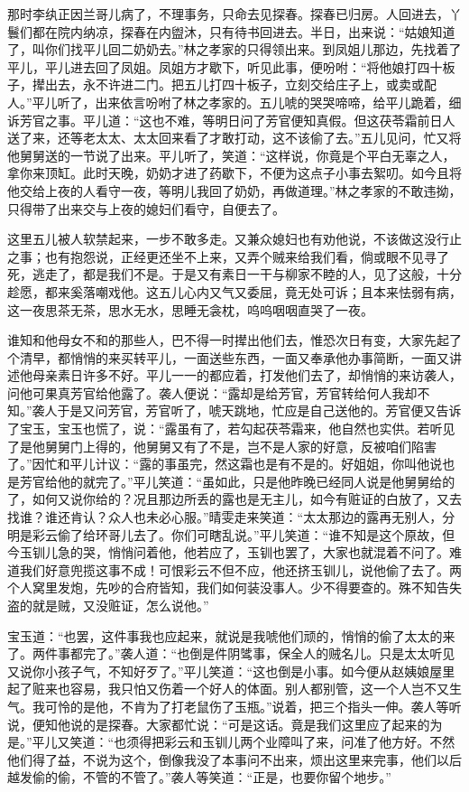 那时李纨正因兰哥儿病了，不理事务，只命去见探春。探春已归房。人回进去，丫鬟们都在院内纳凉，探春在内盥沐，只有待书回进去。半日，出来说：``姑娘知道了，叫你们找平儿回二奶奶去。''林之孝家的只得领出来。到凤姐儿那边，先找着了平儿，平儿进去回了凤姐。凤姐方才歇下，听见此事，便吩咐：``将他娘打四十板子，撵出去，永不许进二门。把五儿打四十板子，立刻交给庄子上，或卖或配人。''平儿听了，出来依言吩咐了林之孝家的。五儿唬的哭哭啼啼，给平儿跪着，细诉芳官之事。平儿道：``这也不难，等明日问了芳官便知真假。但这茯苓霜前日人送了来，还等老太太、太太回来看了才敢打动，这不该偷了去。''五儿见问，忙又将他舅舅送的一节说了出来。平儿听了，笑道：``这样说，你竟是个平白无辜之人，拿你来顶缸。此时天晚，奶奶才进了药歇下，不便为这点子小事去絮叨。如今且将他交给上夜的人看守一夜，等明儿我回了奶奶，再做道理。''林之孝家的不敢违拗，只得带了出来交与上夜的媳妇们看守，自便去了。

这里五儿被人软禁起来，一步不敢多走。又兼众媳妇也有劝他说，不该做这没行止之事；也有抱怨说，正经更还坐不上来，又弄个贼来给我们看，倘或眼不见寻了死，逃走了，都是我们不是。于是又有素日一干与柳家不睦的人，见了这般，十分趁愿，都来奚落嘲戏他。这五儿心内又气又委屈，竟无处可诉；且本来怯弱有病，这一夜思茶无茶，思水无水，思睡无衾枕，呜呜咽咽直哭了一夜。

谁知和他母女不和的那些人，巴不得一时撵出他们去，惟恐次日有变，大家先起了个清早，都悄悄的来买转平儿，一面送些东西，一面又奉承他办事简断，一面又讲述他母亲素日许多不好。平儿一一的都应着，打发他们去了，却悄悄的来访袭人，问他可果真芳官给他露了。袭人便说：``露却是给芳官，芳官转给何人我却不知。''袭人于是又问芳官，芳官听了，唬天跳地，忙应是自己送他的。芳官便又告诉了宝玉，宝玉也慌了，说：``露虽有了，若勾起茯苓霜来，他自然也实供。若听见了是他舅舅门上得的，他舅舅又有了不是，岂不是人家的好意，反被咱们陷害了。''因忙和平儿计议：``露的事虽完，然这霜也是有不是的。好姐姐，你叫他说也是芳官给他的就完了。''平儿笑道：``虽如此，只是他昨晚已经同人说是他舅舅给的了，如何又说你给的？况且那边所丢的露也是无主儿，如今有赃证的白放了，又去找谁？谁还肯认？众人也未必心服。''晴雯走来笑道：``太太那边的露再无别人，分明是彩云偷了给环哥儿去了。你们可瞎乱说。''平儿笑道：``谁不知是这个原故，但今玉钏儿急的哭，悄悄问着他，他若应了，玉钏也罢了，大家也就混着不问了。难道我们好意兜揽这事不成！可恨彩云不但不应，他还挤玉钏儿，说他偷了去了。两个人窝里发炮，先吵的合府皆知，我们如何装没事人。少不得要查的。殊不知告失盗的就是贼，又没赃证，怎么说他。''

宝玉道：``也罢，这件事我也应起来，就说是我唬他们顽的，悄悄的偷了太太的来了。两件事都完了。''袭人道：``也倒是件阴骘事，保全人的贼名儿。只是太太听见又说你小孩子气，不知好歹了。''平儿笑道：``这也倒是小事。如今便从赵姨娘屋里起了赃来也容易，我只怕又伤着一个好人的体面。别人都别管，这一个人岂不又生气。我可怜的是他，不肯为了打老鼠伤了玉瓶。''说着，把三个指头一伸。袭人等听说，便知他说的是探春。大家都忙说：``可是这话。竟是我们这里应了起来的为是。''平儿又笑道：``也须得把彩云和玉钏儿两个业障叫了来，问准了他方好。不然他们得了益，不说为这个，倒像我没了本事问不出来，烦出这里来完事，他们以后越发偷的偷，不管的不管了。''袭人等笑道：``正是，也要你留个地步。''


